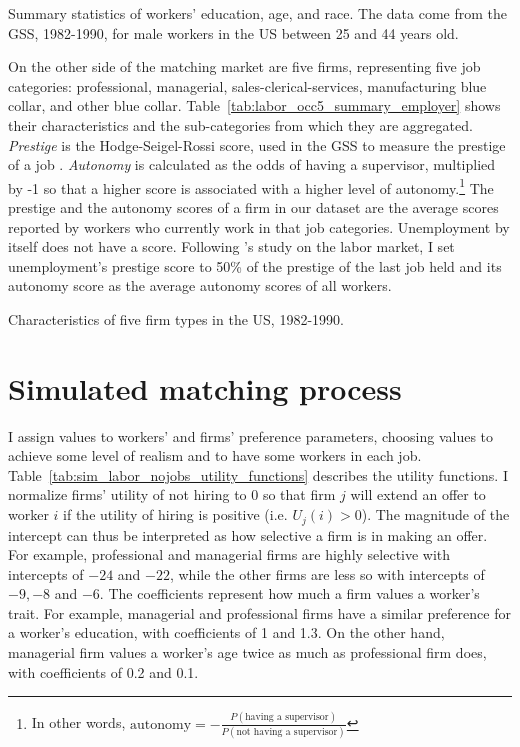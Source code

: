 \begin{table}[!ht]
  \centering
  \caption[Summary statistics of US male workers between 25 and 44 years old,
  1982-1990.]{Summary statistics of workers' education, age, and race. The data
    come from the GSS, 1982-1990, for male workers in the US between 25 and 44
    years old.}
  \label{tab:labor_occ5_summary_employee}
  
\end{table}

On the other side of the matching market are five firms, representing five job
categories: professional, managerial, sales-clerical-services, manufacturing
blue collar, and other blue collar. Table~\ref{tab:labor_occ5_summary_employer}
shows their characteristics and the sub-categories from which they are
aggregated. \textit{Prestige} is the Hodge-Seigel-Rossi score, used in the GSS
to measure the prestige of a job \citep{Hodge1964, NORC2014}. \textit{Autonomy}
is calculated as the odds of having a supervisor, multiplied by -1 so that a
higher score is associated with a higher level of autonomy.\footnote{In other
  words, $\text{autonomy} = -\frac{P(\text{having a supervisor})}{P(\text{not
      having a supervisor})}$} The prestige and the autonomy scores of a firm in
our dataset are the average scores reported by workers who currently work in
that job categories. Unemployment by itself does not have a score. Following
\citet{Logan1996}'s study on the labor market, I set unemployment's prestige
score to 50\% of the prestige of the last job held and its autonomy score as the
average autonomy scores of all workers.

\begin{table}[tbp]
  \centering
  \caption[Characteristics of five firm types in the US,
  1982-1990.]{Characteristics of five firm types in the US, 1982-1990.}
  \label{tab:labor_occ5_summary_employer}
  
\end{table}

\section{Simulated matching process}

I assign values to workers' and firms' preference parameters, choosing values to
achieve some level of realism and to have some workers in each job.
Table~\ref{tab:sim_labor_nojobs_utility_functions} describes the utility
functions. I normalize firms' utility of not hiring to 0 so that firm $j$ will
extend an offer to worker $i$ if the utility of hiring is positive (i.e.
$U_{j}(i) > 0$). The magnitude of the intercept can thus be interpreted as how
selective a firm is in making an offer. For example, professional and managerial
firms are highly selective with intercepts of $-24$ and $-22$, while the other
firms are less so with intercepts of $-9, -8$ and $-6$. The coefficients
represent how much a firm values a worker's trait. For example, managerial and
professional firms have a similar preference for a worker's education, with
coefficients of 1 and 1.3. On the other hand, managerial firm values a worker's
age twice as much as professional firm does, with coefficients of 0.2 and 0.1.

